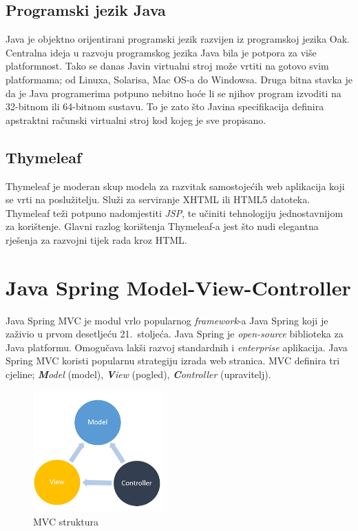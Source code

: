 \documentclass[times, utf8, zavrsni, numeric]{fer}
\begin{document}
\subsection{Programski jezik Java}
\qquad Java je objektno orijentirani programski jezik razvijen iz programskoj jezika Oak\footnotemark{}.
Centralna ideja u razvoju programskog jezika Java bila je potpora za više platformnost.
Tako se danas Javin virtualni stroj može vrtiti na gotovo svim platformama; od Linuxa, Solarisa, Mac OS-a do Windowsa.
Druga bitna stavka je da je Java programerima potpuno nebitno hoće li se njihov program izvoditi na 32-bitnom ili 64-bitnom sustavu.
To je zato što Javina specifikacija definira apstraktni računski virtualni stroj kod kojeg je sve propisano.
\subsection{Thymeleaf}
\qquad Thymeleaf je moderan skup modela za razvitak samostojećih web aplikacija koji se vrti na poslužitelju.
Služi za serviranje XHTML ili HTML5 datoteka.
Thymeleaf teži potpuno nadomjestiti \textit{JSP}\footnotemark{}, te učiniti tehnologiju jednostavnijom za korištenje.
Glavni razlog korištenja Thymeleaf-a jest što nudi elegantna rješenja za razvojni tijek rada kroz HTML.

\section{Java Spring Model-View-Controller}
\qquad Java Spring MVC je modul vrlo popularnog \textit{framework}-a\footnotemark{} Java Spring koji je zaživio u prvom desetljeću 21.~stoljeća.
Java Spring je \textit{open-source}\footnotemark{} biblioteka za Java platformu.
Omogučava lakši razvoj standardnih i \textit{enterprise}\footnotemark{} aplikacija.
Java Spring MVC koristi popularnu strategiju izrada web stranica.
MVC definira tri cjeline; \textit{\textbf{M}odel} (model), \textit{\textbf{V}iew} (pogled), \textit{\textbf{C}ontroller} (upravitelj).
\begin{figure}[htb]
				\centering
				\includegraphics[width=5cm]{images/mvc.png}
				\caption{MVC struktura}
				\label{fig:mvc}
\end{figure}
\end{document}
